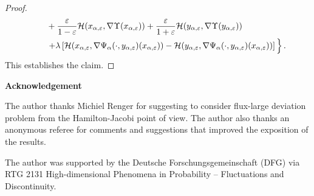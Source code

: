 \documentclass[a4paper]{article}
\newcommand{\cH}{\mathcal{H}}
\numberwithin{equation}{section}
\theoremstyle{definition}
\begin{document}
\begin{proof}
\begin{align*}
		& \qquad + \frac{\varepsilon}{1-\varepsilon}\cH(x_{\alpha,\varepsilon}, \nabla \Upsilon(x_{\alpha,\varepsilon})) + \frac{\varepsilon}{1+\varepsilon}\cH(y_{\alpha,\varepsilon}, \nabla\Upsilon(y_{\alpha,\varepsilon})) \\
		& \left. \qquad +  \lambda \left[\cH(x_{\alpha,\varepsilon},\nabla\Psi_\alpha(\cdot,y_{\alpha,\varepsilon})(x_{\alpha,\varepsilon})) - \cH(y_{\alpha,\varepsilon},\nabla\Psi_\alpha(\cdot,y_{\alpha,\varepsilon})(x_{\alpha,\varepsilon}))\right] \vphantom{\sum} \right\}.
	\end{align*}
	This establishes the claim.
\end{proof}


\smallskip

\textbf{Acknowledgement} 

The author thanks Michiel Renger for suggesting to consider flux-large deviation problem from the Hamilton-Jacobi point of view. The author also thanks an anonymous referee for comments and suggestions that improved the exposition of the results.

The author was supported by the Deutsche Forschungsgemeinschaft (DFG) via RTG 2131 High-dimensional Phenomena in Probability – Fluctuations and Discontinuity.



\end{document}
